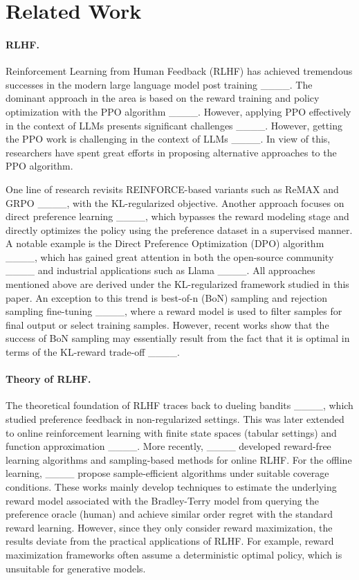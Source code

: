 \section{Related Work}
\paragraph{RLHF.} Reinforcement Learning from Human Feedback (RLHF) has achieved tremendous successes in the modern large language model post training ____. The dominant approach in the area is based on the reward training and policy optimization with the PPO algorithm ____. However, applying PPO effectively in the context of LLMs presents significant challenges ____. However, getting the PPO work is challenging in the context of LLMs ____. In view of this, researchers have spent great efforts in proposing alternative approaches to the PPO algorithm. 

One line of research revisits REINFORCE-based variants such as ReMAX and GRPO ____, with the KL-regularized objective. Another approach focuses on direct preference learning ____, which bypasses the reward modeling stage and directly optimizes the policy using the preference dataset in a supervised manner. A notable example is the Direct Preference Optimization (DPO) algorithm ____, which has gained great attention in both the open-source community ____ and industrial applications such as Llama ____. All approaches mentioned above are derived under the KL-regularized framework studied in this paper. An exception to this trend is best-of-n (BoN) sampling and rejection sampling fine-tuning ____, where a reward model is used to filter samples for final output or select training samples. However, recent works show that the success of BoN sampling may essentially result from the fact that it is optimal in terms of the KL-reward trade-off ____.


\paragraph{Theory of RLHF.} The theoretical foundation of RLHF traces back to dueling bandits ____, which studied preference feedback in non-regularized settings. This was later extended to online reinforcement learning with finite state spaces (tabular settings) and function approximation ____. More recently, ____ developed reward-free learning algorithms and sampling-based methods for online RLHF. For the offline learning,  ____ propose sample-efficient algorithms under suitable coverage conditions. These works mainly develop techniques to estimate the underlying reward model associated with the Bradley-Terry model from querying the preference oracle (human) and achieve similar order regret with the standard reward learning. However, since they only consider reward maximization, the results deviate from the practical applications of RLHF. For example, reward maximization frameworks often assume a deterministic optimal policy, which is unsuitable for generative models.

